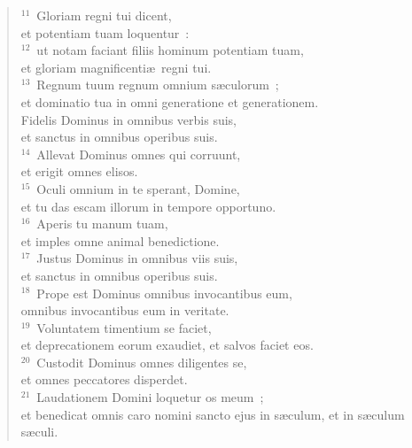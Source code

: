 \begin{flushleft}
\begin{verse}
${}^{11}$~Gloriam regni tui dicent,\\ et potentiam tuam loquentur~:\\
${}^{12}$~ut notam faciant filiis hominum potentiam tuam,\\ et gloriam magnificenti\ae\ regni tui.\\
${}^{13}$~Regnum tuum regnum omnium s\ae culorum~;\\ et dominatio tua in omni generatione et generationem.\\ Fidelis Dominus in omnibus verbis suis,\\ et sanctus in omnibus operibus suis.\\
${}^{14}$~Allevat Dominus omnes qui corruunt,\\ et erigit omnes elisos.\\
${}^{15}$~Oculi omnium in te sperant, Domine,\\ et tu das escam illorum in tempore opportuno.\\
${}^{16}$~Aperis tu manum tuam,\\ et imples omne animal benedictione.\\
${}^{17}$~Justus Dominus in omnibus viis suis,\\ et sanctus in omnibus operibus suis.\\
${}^{18}$~Prope est Dominus omnibus invocantibus eum,\\ omnibus invocantibus eum in veritate.\\
${}^{19}$~Voluntatem timentium se faciet,\\ et deprecationem eorum exaudiet, et salvos faciet eos.\\
${}^{20}$~Custodit Dominus omnes diligentes se,\\ et omnes peccatores disperdet.\\
${}^{21}$~Laudationem Domini loquetur os meum~;\\ et benedicat omnis caro nomini sancto ejus in s\ae culum, et in s\ae culum s\ae culi.\end{verse}\end{flushleft}



